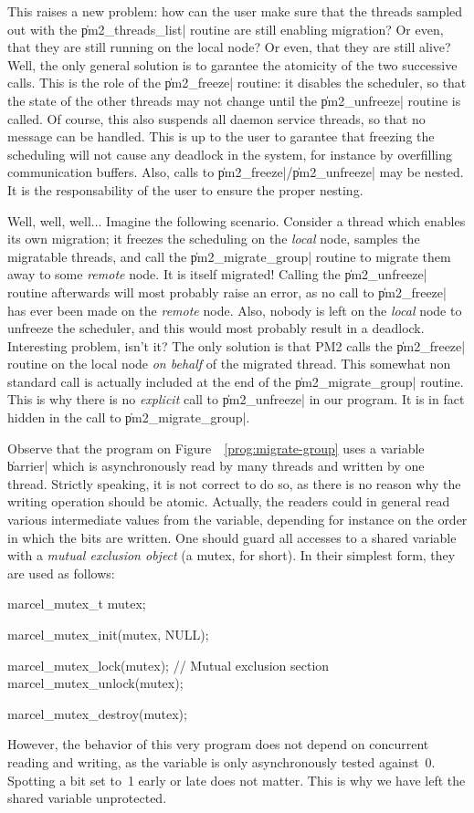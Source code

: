 This raises a new problem: how can the user make sure that the threads
sampled out with the \|pm2_threads_list| routine are still enabling
migration? Or even, that they are still running on the local node? Or
even, that they are still alive? Well, the only general solution is to 
garantee the atomicity of the two successive calls. This is the role
of the \|pm2_freeze| routine: it disables the scheduler, so that the
state of the other threads may not change until the \|pm2_unfreeze|
routine is called. Of course, this also suspends all daemon service
threads, so that no message can be handled. This is up to the user to
garantee that freezing the scheduling will not cause any deadlock in
the system, for instance by overfilling communication buffers. Also, 
calls to \|pm2_freeze|/\|pm2_unfreeze| may be nested. It is the
responsability of the user to ensure the proper nesting.

Well, well, well... Imagine the following scenario. Consider a thread
which enables its own migration; it freezes the scheduling on the
\emph{local} node, samples the migratable threads, and call the
\|pm2_migrate_group| routine to migrate them away to some
\emph{remote} node. It is itself migrated! Calling the \|pm2_unfreeze|
routine afterwards will most probably raise an error, as no call to
\|pm2_freeze| has ever been made on the \emph{remote} node. Also,
nobody is left on the \emph{local} node to unfreeze the scheduler, and
this would most probably result in a deadlock.  Interesting problem,
isn't it? The only solution is that PM2 calls the \|pm2_freeze|
routine on the local node \emph{on behalf} of the migrated thread.
This somewhat non standard call is actually included at the end of the
\|pm2_migrate_group| routine.  This is why there is no \emph{explicit}
call to \|pm2_unfreeze| in our program.  It is in
fact hidden in the call to \|pm2_migrate_group|.

Observe that the program on Figure~~\ref{prog:migrate-group} uses a
variable \|barrier| which is asynchronously read by many threads and
written by one thread. Strictly speaking, it is not correct to do so,
as there is no reason why the writing operation should be
atomic. Actually, the readers could in general read various
intermediate values from the variable, depending for instance on the
order in which the bits are written. One should guard all accesses to
a shared variable with a \emph{mutual exclusion object} (a mutex, for
short). In their simplest form, they are used as follows:
\begin{program}
marcel_mutex_t mutex;

marcel_mutex_init(mutex, NULL);

marcel_mutex_lock(mutex);
// Mutual exclusion section
marcel_mutex_unlock(mutex);

marcel_mutex_destroy(mutex);
\end{program}
However, the behavior of this very program does not depend on
concurrent reading and writing, as the variable is only asynchronously
tested against~0. Spotting a bit set to~1 early or late does not
matter. This is why we have left the shared variable unprotected.

